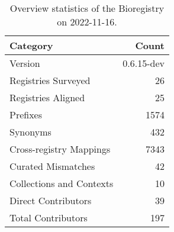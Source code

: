 \begin{table}
\centering
\caption{Overview statistics of the Bioregistry on 2022-11-16.}
\label{tab:bioregistry-summary}
\begin{tabular}{lr}
\toprule
                Category &      Count \\
\midrule
                 Version & 0.6.15-dev \\
     Registries Surveyed &         26 \\
      Registries Aligned &         25 \\
                Prefixes &       1574 \\
                Synonyms &        432 \\
 Cross-registry Mappings &       7343 \\
      Curated Mismatches &         42 \\
Collections and Contexts &         10 \\
     Direct Contributors &         39 \\
      Total Contributors &        197 \\
\bottomrule
\end{tabular}
\end{table}
